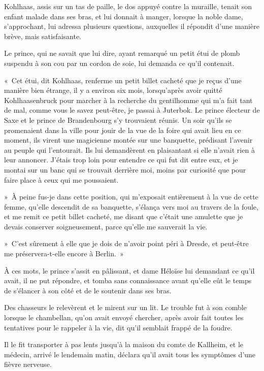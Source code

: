 \documentclass[french,twoside]{book} %
\begin{document}
Kohlhaas, assis sur un tas de paille, le dos appuyé contre la muraille, tenait son enfant malade dans ses bras, et lui donnait à manger, lorsque la noble dame, s’approchant, lui adressa plusieurs questions, auxquelles il répondit d’une manière brève, mais satisfaisante.\par
Le prince, qui ne savait que lui dire, ayant remarqué un petit étui de plomb suspendu à son cou par un cordon de soie, lui demanda ce qu’il contenait.\par
« Cet étui, dit Kohlhaas, renferme un petit billet cacheté que je reçus d’une manière bien étrange, il y a environ six mois, lorsqu’après avoir quitté Kohlhaasenbruck pour marcher à la recherche du gentilhomme qui m’a fait tant de mal, comme vous le savez peut-être, je passai à Juterbok. Le prince électeur de Saxe et le prince de Brandenbourg s’y trouvaient réunis. Un soir qu’ils se promenaient dans la ville pour jouir de la vue de la foire qui avait lieu en ce moment, ils virent une magicienne montée sur une banquette, prédisant l’avenir au peuple qui l’entourait. Ils lui demandèrent en plaisantant si elle n’avait rien à leur annoncer. J’étais trop loin pour entendre ce qui fut dit entre eux, et je montai sur un banc qui se trouvait derrière moi, moins par curiosité que pour faire place à ceux qui me poussaient.\par
» À peine fus-je dans cette position, qui m’exposait entièrement à la vue de cette femme, qu’elle descendit de sa banquette, s’élança vers moi au travers de la foule, et me remit ce petit billet cacheté, me disant que c’était une amulette que je devais conserver soigneusement, parce qu’elle me sauverait la vie.\par
» C’est sûrement à elle que je dois de n’avoir point péri à Dresde, et peut-être me préservera-t-elle encore à Berlin. »\par
À ces mots, le prince s’assit en pâlissant, et dame Héloïse lui demandant ce qu’il avait, il ne put répondre, et tomba sans connaissance avant qu’elle eût le temps de s’élancer à son côté et de le soutenir dans ses bras.\par
Des chasseurs le relevèrent et le mirent sur un lit. Le trouble fut à son comble lorsque le chambellan, qu’on avait envoyé chercher, après avoir fait toutes les tentatives pour le rappeler à la vie, dit qu’il semblait frappé de la foudre.\par
Il le fit transporter à pas lents jusqu’à la maison du comte de Kallheim, et le médecin, arrivé le lendemain matin, déclara qu’il avait tous les symptômes d’une fièvre nerveuse.\par
\end{document}
